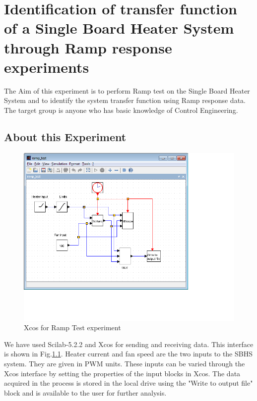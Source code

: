 \chapter{Identification of transfer function of a Single Board Heater System through Ramp response experiments}\label{chap2}
The Aim of this experiment is to perform Ramp test on the Single Board Heater System and to identify the system transfer function using Ramp response data. The target group is anyone who has basic knowledge of Control Engineering.
\section{About this Experiment}

\begin{figure}
\centering
\includegraphics[width=0.7\linewidth]{Ramp-test_manual/ramp_xcos.jpg}
\caption{Xcos for Ramp Test experiment}
\label{Xcos_rt}
\end{figure} 
We have used Scilab-5.2.2 and Xcos for sending and receiving data. This interface is shown in Fig.\ref{Xcos_rt}. Heater current and fan speed are the two inputs to the SBHS system. They are given in PWM units. These inputs can be varied through the Xcos interface by setting the properties of the input blocks in Xcos. The data acquired in the process is stored in the local drive using the "Write to output file" block and is available to the user for further analysis.
